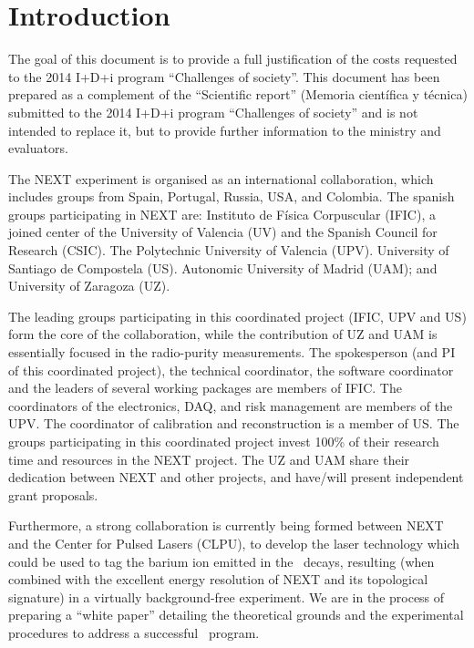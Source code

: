 \documentclass[a4paper,11pt,oneside]{article}
\begin{document}
\section{\bf Introduction}
\label{sec.intro}
The goal of this document is to provide a full justification of the costs requested to the 2014 I+D+i program
``Challenges of society''. This document has been prepared as a complement of the ``Scientific report'' (Memoria científica y técnica) submitted to the 2014 I+D+i program
``Challenges of society'' and is not intended to replace it, but to provide further information to the ministry and evaluators. 

The NEXT experiment is organised as an international collaboration, which includes groups from Spain, Portugal, Russia, USA, and Colombia. The spanish groups participating in NEXT are: Instituto de Física Corpuscular (IFIC), a joined center of the University of Valencia (UV) and the Spanish Council for Research (CSIC). The  Polytechnic University of Valencia (UPV). University of Santiago de Compostela (US). Autonomic University of Madrid (UAM); and University of Zaragoza (UZ). 

The leading groups participating in this coordinated project (IFIC, UPV and US) form the core of the collaboration, while the contribution of UZ and UAM is essentially focused in the radio-purity measurements. The spokesperson (and PI of this coordinated project), the technical coordinator, the software coordinator and the leaders of several working  packages are members of IFIC. The coordinators of the electronics, DAQ, and risk management are members of the UPV. The coordinator of calibration and reconstruction is a member of US. The groups participating in this coordinated project invest 100\% of their research time and resources in the NEXT project. The UZ and UAM share their dedication between NEXT and other projects, and have/will present independent grant proposals.

Furthermore, a strong collaboration is currently being formed between NEXT and the Center for Pulsed Lasers (CLPU), to develop the laser technology which could be used to tag the barium ion emitted in the \bb\ decays, resulting (when combined with the excellent energy resolution of NEXT and its topological signature) in a virtually background-free experiment. We are in the process of preparing a ``white paper'' detailing the theoretical grounds and the experimental procedures to address a successful  \BATA\ program. 
\end{document}
